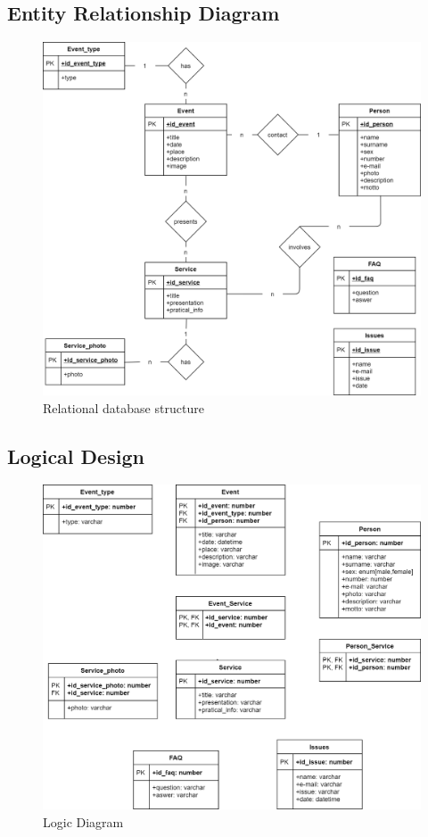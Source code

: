 \subsection{Entity Relationship Diagram}
\begin{figure}[h!]
		\centering
		\begin{minipage}[b]{1\textwidth}
    			\includegraphics[width=\textwidth]{./assets/ER_diagram.png}
			\caption{Relational database structure}
		\end{minipage}
\end{figure}
\FloatBarrier
\clearpage

\subsection{Logical Design}
\begin{figure}[h!]
		\centering
		\begin{minipage}[b]{1\textwidth}
    			\includegraphics[width=\textwidth]{./assets/logical_diagram.png}
			\caption{Logic Diagram}
		\end{minipage}
\end{figure}
\FloatBarrier